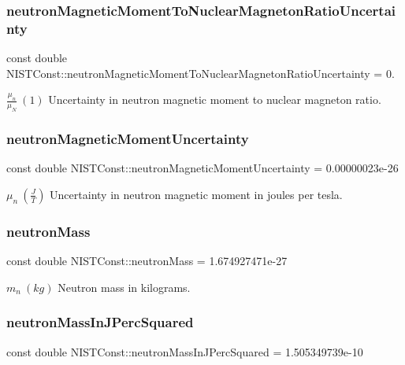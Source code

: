\subsubsection{\texorpdfstring{neutron\+Magnetic\+Moment\+To\+Nuclear\+Magneton\+Ratio\+Uncertainty}{neutronMagneticMomentToNuclearMagnetonRatioUncertainty}}
{\footnotesize\ttfamily const double N\+I\+S\+T\+Const\+::neutron\+Magnetic\+Moment\+To\+Nuclear\+Magneton\+Ratio\+Uncertainty = 0.}

$\frac{\mu_n}{\mu_N} \ (1)$ Uncertainty in neutron magnetic moment to nuclear magneton ratio. \mbox{\label{group___neutron_gac34c63a7cdf2e8b0a98c38835dafe19d}} 
\subsubsection{\texorpdfstring{neutron\+Magnetic\+Moment\+Uncertainty}{neutronMagneticMomentUncertainty}}
{\footnotesize\ttfamily const double N\+I\+S\+T\+Const\+::neutron\+Magnetic\+Moment\+Uncertainty = 0.\+00000023e-\/26}

$\mu_n \ (\frac{J}{T})$ Uncertainty in neutron magnetic moment in joules per tesla. \mbox{\label{group___neutron_ga74edcc04e59f152b2afa0fdba8683383}} 
\subsubsection{\texorpdfstring{neutron\+Mass}{neutronMass}}
{\footnotesize\ttfamily const double N\+I\+S\+T\+Const\+::neutron\+Mass = 1.\+674927471e-\/27}

$m_n \ (kg)$ Neutron mass in kilograms. \mbox{\label{group___neutron_ga28892913d6ed40673a170941f79bb86e}} 
\subsubsection{\texorpdfstring{neutron\+Mass\+In\+J\+Perc\+Squared}{neutronMassInJPercSquared}}
{\footnotesize\ttfamily const double N\+I\+S\+T\+Const\+::neutron\+Mass\+In\+J\+Perc\+Squared = 1.\+505349739e-\/10}


